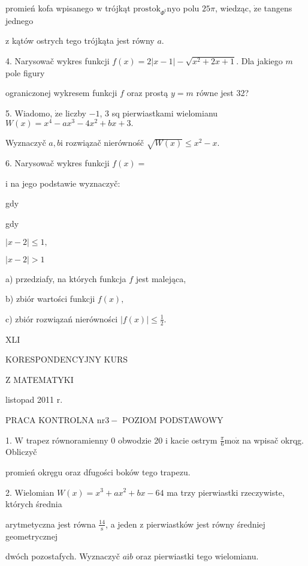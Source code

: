 \documentclass[a4paper,12pt]{article}
\begin{document}
promień kofa wpisanego $\mathrm{w}$ trójkąt $\mathrm{p}\mathrm{r}\mathrm{o}\mathrm{s}\mathrm{t}\mathrm{o}\mathrm{k}_{\Phi^{\mathrm{t}}}\mathrm{n}\mathrm{y}\mathrm{o}$ polu $ 25\pi$, wiedząc, $\dot{\mathrm{z}}\mathrm{e}$ tangens jednego

$\mathrm{z}$ kątów ostrych tego trójkąta jest równy $a.$

4. Narysowač wykres funkcji $f(x) =2|x-1|-\sqrt{x^{2}+2x+1}$. Dla jakiego $m$ pole figury

ograniczonej wykresem funkcji $f$ oraz prostą $y=m$ równe jest 32?

5. Wiadomo, $\dot{\mathrm{z}}\mathrm{e}$ liczby $-1$, 3 sq pierwiastkami wielomianu $W(x)=x^{4}-ax^{3}-4x^{2}+bx+3.$

Wyznaczyč $a, b\mathrm{i}$ rozwiązač nierównośč $\sqrt{W(x)}\leq x^{2}-x.$

6. Narysowač wykres funkcji $f(x)=$

$\mathrm{i}$ na jego podstawie wyznaczyč:

gdy

gdy

$|x-2|\leq 1,$

$|x-2|>1$

a) przedziafy, na których funkcja $f$ jest malejąca,

b) zbiór wartości funkcji $f(x),$

c) zbiór rozwiązań nierówności $|f(x)|\displaystyle \leq\frac{1}{2}.$





XLI

KORESPONDENCYJNY KURS

Z MATEMATYKI

listopad 2011 r.

PRACA KONTROLNA $\mathrm{n}\mathrm{r} 3-$ POZIOM PODSTAWOWY

1. $\mathrm{W}$ trapez równoramienny $0$ obwodzie 20 $\mathrm{i}$ kacie ostrym $\displaystyle \frac{\pi}{6}\mathrm{m}\mathrm{o}\dot{\mathrm{z}}$ na wpisač okrqg. Obliczyč

promień okręgu oraz dfugości boków tego trapezu.

2. Wielomian $W(x)=x^{3}+ax^{2}+bx-64$ ma trzy pierwiastki rzeczywiste, których średnia

arytmetyczna jest równa $\displaystyle \frac{14}{\mathrm{s}}$, a jeden $\mathrm{z}$ pierwiastków jest równy średniej geometrycznej

dwóch pozostafych. Wyznaczyč $a\mathrm{i}b$ oraz pierwiastki tego wielomianu.
\end{document}
